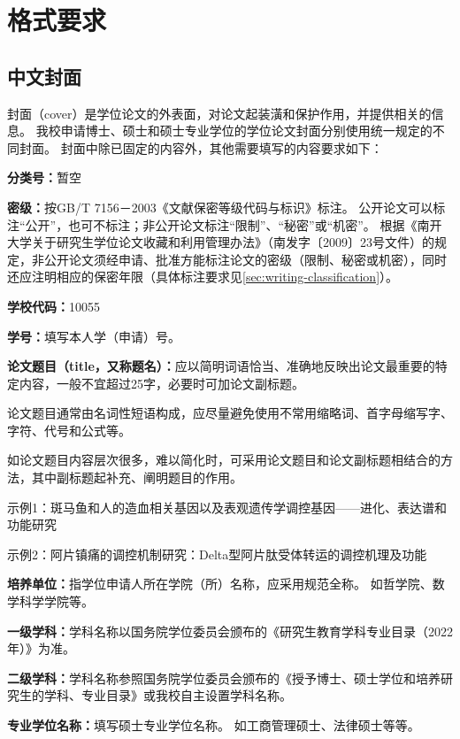 \chapter{格式要求}
\label{chap:format-requirements}

\section{中文封面}
\label{sec:format-cover}

封面（cover）是学位论文的外表面，对论文起装潢和保护作用，并提供相关的信息。
我校申请博士、硕士和硕士专业学位的学位论文封面分别使用统一规定的不同封面。
封面中除已固定的内容外，其他需要填写的内容要求如下：

\textbf{分类号：}暂空

\textbf{密级：}按GB/T 7156－2003《文献保密等级代码与标识》标注。
公开论文可以标注“公开”，也可不标注；非公开论文标注“限制”、“秘密”或“机密”。
根据《南开大学关于研究生学位论文收藏和利用管理办法》（南发字〔2009〕23号文件）的规定，非公开论文须经申请、批准方能标注论文的密级（限制、秘密或机密），同时还应注明相应的保密年限（具体标注要求见\ref{sec:writing-classification}）。

\textbf{学校代码：}10055

\textbf{学号：}填写本人学（申请）号。

\textbf{论文题目（title，又称题名）：}应以简明词语恰当、准确地反映出论文最重要的特定内容，一般不宜超过25字，必要时可加论文副标题。

论文题目通常由名词性短语构成，应尽量避免使用不常用缩略词、首字母缩写字、字符、代号和公式等。

如论文题目内容层次很多，难以简化时，可采用论文题目和论文副标题相结合的方法，其中副标题起补充、阐明题目的作用。

示例1：斑马鱼和人的造血相关基因以及表观遗传学调控基因——进化、表达谱和功能研究

示例2：阿片镇痛的调控机制研究：Delta型阿片肽受体转运的调控机理及功能

\textbf{培养单位：}指学位申请人所在学院（所）名称，应采用规范全称。
如哲学院、数学科学学院等。

\textbf{一级学科：}学科名称以国务院学位委员会颁布的《研究生教育学科专业目录（2022年）》为准。

\textbf{二级学科：}学科名称参照国务院学位委员会颁布的《授予博士、硕士学位和培养研究生的学科、专业目录》或我校自主设置学科名称。

\textbf{专业学位名称：}填写硕士专业学位名称。
如工商管理硕士、法律硕士等等。

